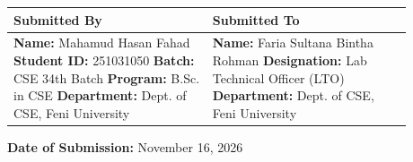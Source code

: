 \documentclass[10pt,a4paper]{article}
\begin{document}
\begin{titlepage}
\begin{center}
  \vspace{1.8cm}

  \begin{center}
  \renewcommand{\arraystretch}{1.3}
  \begin{tabular}{|p{0.44\linewidth}|p{0.44\linewidth}|}
    \hline
    \rowcolor{backcolour}
    \textbf{Submitted By} & \textbf{Submitted To} \\
    \hline
    \textbf{Name:} Mahamud Hasan Fahad \newline
    \textbf{Student ID:} 251031050 \newline
    \textbf{Batch:} CSE 34th Batch \newline
    \textbf{Program:} B.Sc. in CSE \newline
    \textbf{Department:} Dept. of CSE, Feni University 
    & 
    \textbf{Name:} Faria Sultana Bintha Rohman \newline
    \textbf{Designation:} Lab Technical Officer (LTO) \newline
    \textbf{Department:} Dept. of CSE, Feni University \\[22pt]
    \hline
  \end{tabular}
  \end{center}

  \vfill
  {\large \textbf{Date of Submission:} November 16, 2026}
  \vspace{0.6cm}
\end{center}

\end{titlepage}

\newpage
\setcounter{page}{2}

\end{document}

